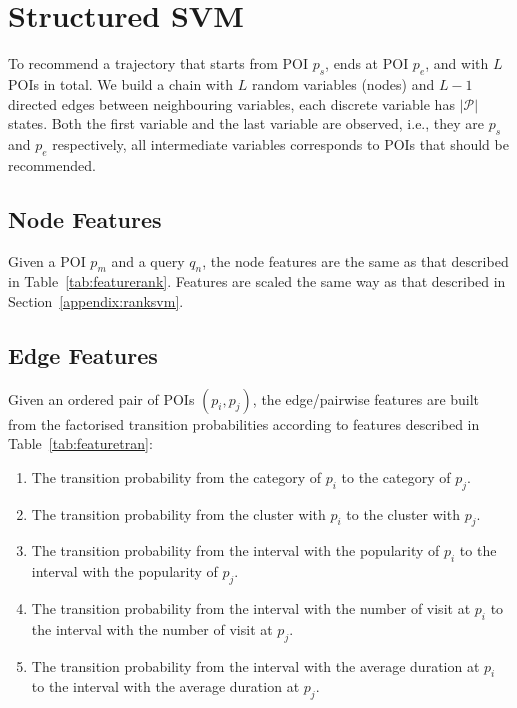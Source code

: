 {\section{Structured SVM}
\label{appendix:ssvm}

To recommend a trajectory that starts from POI $p_s$, ends at POI $p_e$, and with $L$ POIs in total.
We build a chain with $L$ random variables (nodes) and $L-1$ directed edges between neighbouring variables,
each discrete variable has $|\mathcal{P}|$ states.
Both the first variable and the last variable are observed, i.e., they are $p_s$ and $p_e$ respectively,
all intermediate variables corresponds to POIs that should be recommended.


\subsection{Node Features}
\label{appendix:node}
Given a POI $p_m$ and a query $q_n$, the node features are the same as that described in Table~\ref{tab:featurerank}.
Features are scaled the same way as that described in Section~\ref{appendix:ranksvm}.


\subsection{Edge Features}
\label{appendix:edge}
Given an ordered pair of POIs $(p_i, p_j)$, 
the edge/pairwise features are built from the factorised transition probabilities 
according to features described in Table~\ref{tab:featuretran}:
\begin{enumerate}
\item The transition probability from the category of $p_i$ to the category of $p_j$.
\item The transition probability from the cluster with $p_i$ to the cluster with $p_j$.
\item The transition probability from the interval with the popularity of $p_i$ to the interval 
      with the popularity of $p_j$.
\item The transition probability from the interval with the number of visit at $p_i$ to the interval 
      with the number of visit at $p_j$.
\item The transition probability from the interval with the average duration at $p_i$ to the interval 
      with the average duration at $p_j$.
\end{enumerate}


}

